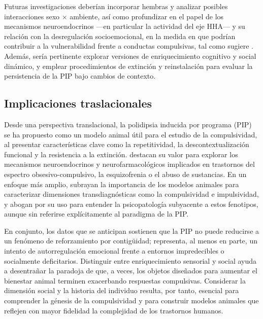 \documentclass[12pt,a4paper]{article}
\begin{document}
\begin{multicols}{2}
Futuras investigaciones deberían incorporar hembras y analizar posibles interacciones sexo × ambiente, así como profundizar en el papel de los mecanismos neuroendocrinos —en particular la actividad del eje HHA— y su relación con la desregulación socioemocional, en la medida en que podrían contribuir a la vulnerabilidad frente a conductas compulsivas, tal como sugiere \citet{MartinGonzalez2022}. Además, sería pertinente explorar versiones de enriquecimiento cognitivo y social dinámico, y emplear procedimientos de extinción y reinstalación para evaluar la persistencia de la PIP bajo cambios de contexto.


\subsection*{Implicaciones traslacionales}

Desde una perspectiva translacional, la polidipsia inducida por programa (PIP) se ha propuesto como un modelo animal útil para el estudio de la compulsividad, al presentar características clave como la repetitividad, la descontextualización funcional y la resistencia a la extinción. \citet{Moreno2012} destacan su valor para explorar los mecanismos neuroendocrinos y neurofarmacológicos implicados en trastornos del espectro obsesivo-compulsivo, la esquizofrenia o el abuso de sustancias. En un enfoque más amplio, \citet{Fineberg2010} subrayan la importancia de los modelos animales para caracterizar dimensiones transdiagnósticas como la compulsividad e impulsividad, y abogan por su uso para entender la psicopatología subyacente a estos fenotipos, aunque sin referirse explícitamente al paradigma de la PIP.

En conjunto, los datos que se anticipan sostienen que la PIP no puede reducirse a un fenómeno de reforzamiento por contigüidad; representa, al menos en parte, un intento de autorregulación emocional frente a entornos impredecibles o socialmente deficitarios. Distinguir entre enriquecimiento sensorial y social ayuda a desentrañar la paradoja de que, a veces, los objetos diseñados para aumentar el bienestar animal terminen exacerbando respuestas compulsivas. Considerar la dimensión social y la historia del individuo resulta, por tanto, esencial para comprender la génesis de la compulsividad y para construir modelos animales que reflejen con mayor fidelidad la complejidad de los trastornos humanos.




\end{multicols}
\end{document}
